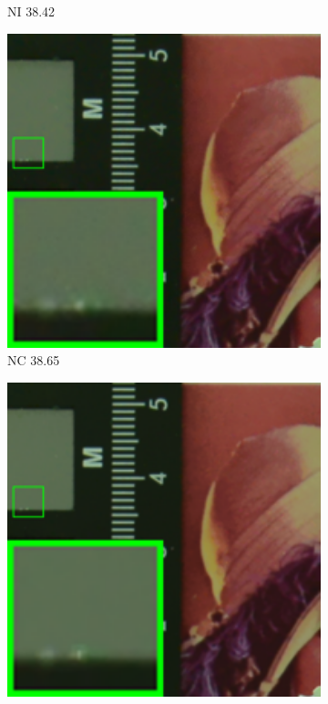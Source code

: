 \begin{figure}
\begin{subfigure}[t]{0.19\textwidth}
\caption{NI 38.42}
    \end{subfigure}
\hfill
    \begin{subfigure}[t]{0.19\textwidth}
        \centering
        \includegraphics[width=1\textwidth]{images/mcwnnm/cc/resize_br_NC_CC15_d800_iso1600_2.png}
		\caption{NC 38.65}
    \end{subfigure}
    \hfill
    \begin{subfigure}[t]{0.19\textwidth}
        \centering
        \includegraphics[width=1\textwidth]{images/mcwnnm/cc/resize_br_CC_d800_iso1600_2.png}

\end{subfigure}
\end{figure}
